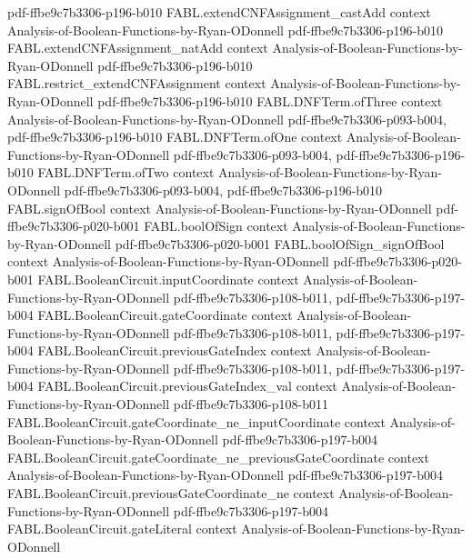 \begin{theorem}
  {pdf-ffbe9c7b3306-p196-b010}
\proofstep
  {FABL.extendCNFAssignment_castAdd}
  {context}
  {Analysis-of-Boolean-Functions-by-Ryan-ODonnell}
  {pdf-ffbe9c7b3306-p196-b010}
\proofstep
  {FABL.extendCNFAssignment_natAdd}
  {context}
  {Analysis-of-Boolean-Functions-by-Ryan-ODonnell}
  {pdf-ffbe9c7b3306-p196-b010}
\proofstep
  {FABL.restrict_extendCNFAssignment}
  {context}
  {Analysis-of-Boolean-Functions-by-Ryan-ODonnell}
  {pdf-ffbe9c7b3306-p196-b010}
\proofstep
  {FABL.DNFTerm.ofThree}
  {context}
  {Analysis-of-Boolean-Functions-by-Ryan-ODonnell}
  {pdf-ffbe9c7b3306-p093-b004,
    pdf-ffbe9c7b3306-p196-b010}
\proofstep
  {FABL.DNFTerm.ofOne}
  {context}
  {Analysis-of-Boolean-Functions-by-Ryan-ODonnell}
  {pdf-ffbe9c7b3306-p093-b004,
    pdf-ffbe9c7b3306-p196-b010}
\proofstep
  {FABL.DNFTerm.ofTwo}
  {context}
  {Analysis-of-Boolean-Functions-by-Ryan-ODonnell}
  {pdf-ffbe9c7b3306-p093-b004,
    pdf-ffbe9c7b3306-p196-b010}
\proofstep
  {FABL.signOfBool}
  {context}
  {Analysis-of-Boolean-Functions-by-Ryan-ODonnell}
  {pdf-ffbe9c7b3306-p020-b001}
\proofstep
  {FABL.boolOfSign}
  {context}
  {Analysis-of-Boolean-Functions-by-Ryan-ODonnell}
  {pdf-ffbe9c7b3306-p020-b001}
\proofstep
  {FABL.boolOfSign_signOfBool}
  {context}
  {Analysis-of-Boolean-Functions-by-Ryan-ODonnell}
  {pdf-ffbe9c7b3306-p020-b001}
\proofstep
  {FABL.BooleanCircuit.inputCoordinate}
  {context}
  {Analysis-of-Boolean-Functions-by-Ryan-ODonnell}
  {pdf-ffbe9c7b3306-p108-b011,
    pdf-ffbe9c7b3306-p197-b004}
\proofstep
  {FABL.BooleanCircuit.gateCoordinate}
  {context}
  {Analysis-of-Boolean-Functions-by-Ryan-ODonnell}
  {pdf-ffbe9c7b3306-p108-b011,
    pdf-ffbe9c7b3306-p197-b004}
\proofstep
  {FABL.BooleanCircuit.previousGateIndex}
  {context}
  {Analysis-of-Boolean-Functions-by-Ryan-ODonnell}
  {pdf-ffbe9c7b3306-p108-b011,
    pdf-ffbe9c7b3306-p197-b004}
\proofstep
  {FABL.BooleanCircuit.previousGateIndex_val}
  {context}
  {Analysis-of-Boolean-Functions-by-Ryan-ODonnell}
  {pdf-ffbe9c7b3306-p108-b011}
\proofstep
  {FABL.BooleanCircuit.gateCoordinate_ne_inputCoordinate}
  {context}
  {Analysis-of-Boolean-Functions-by-Ryan-ODonnell}
  {pdf-ffbe9c7b3306-p197-b004}
\proofstep
  {FABL.BooleanCircuit.gateCoordinate_ne_previousGateCoordinate}
  {context}
  {Analysis-of-Boolean-Functions-by-Ryan-ODonnell}
  {pdf-ffbe9c7b3306-p197-b004}
\proofstep
  {FABL.BooleanCircuit.previousGateCoordinate_ne}
  {context}
  {Analysis-of-Boolean-Functions-by-Ryan-ODonnell}
  {pdf-ffbe9c7b3306-p197-b004}
\proofstep
  {FABL.BooleanCircuit.gateLiteral}
  {context}
  {Analysis-of-Boolean-Functions-by-Ryan-ODonnell}

\end{theorem}
